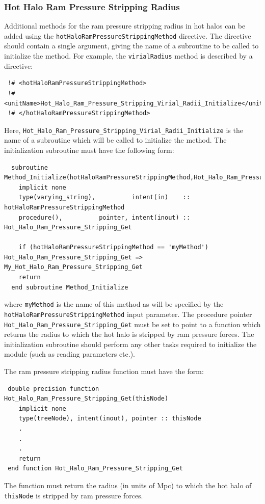 \subsubsection{Hot Halo Ram Pressure Stripping Radius}

Additional methods for the ram pressure stripping radius in hot halos can be added using the {\tt hotHaloRamPressureStrippingMethod} directive. The directive should contain a single argument, giving the name of a subroutine to be called to initialize the method. For example, the {\tt virialRadius} method is described by a directive:
\begin{verbatim}
 !# <hotHaloRamPressureStrippingMethod>
 !#  <unitName>Hot_Halo_Ram_Pressure_Stripping_Virial_Radii_Initialize</unitName>
 !# </hotHaloRamPressureStrippingMethod>
\end{verbatim}
Here, {\tt Hot\_Halo\_Ram\_Pressure\_Stripping\_Virial\_Radii\_Initialize} is the name of a subroutine which will be called to initialize the method. The initialization subroutine must have the following form:
\begin{verbatim}
  subroutine Method_Initialize(hotHaloRamPressureStrippingMethod,Hot_Halo_Ram_Pressure_Stripping_Get)
    implicit none
    type(varying_string),          intent(in)    :: hotHaloRamPressureStrippingMethod
    procedure(),          pointer, intent(inout) :: Hot_Halo_Ram_Pressure_Stripping_Get
    
    if (hotHaloRamPressureStrippingMethod == 'myMethod') Hot_Halo_Ram_Pressure_Stripping_Get => My_Hot_Halo_Ram_Pressure_Stripping_Get
    return
  end subroutine Method_Initialize
\end{verbatim}
where {\tt myMethod} is the name of this method as will be specified by the {\tt hotHaloRamPressureStrippingMethod} input parameter. The procedure pointer {\tt Hot\_Halo\_Ram\_Pressure\_Stripping\_Get} must be set to point to a function which returns the radius to which the hot halo is stripped by ram pressure forces. The initialization subroutine should perform any other tasks required to initialize the module (such as reading parameters etc.).

The ram pressure stripping radius function must have the form:
\begin{verbatim}
 double precision function Hot_Halo_Ram_Pressure_Stripping_Get(thisNode)
    implicit none
    type(treeNode), intent(inout), pointer :: thisNode
    .
    .
    .
    return
 end function Hot_Halo_Ram_Pressure_Stripping_Get
\end{verbatim}
The function must return the radius (in units of Mpc) to which the hot halo of {\tt thisNode} is stripped by ram pressure forces.

